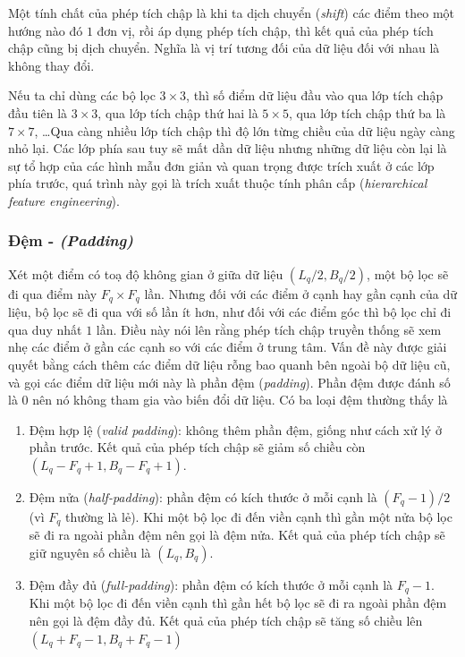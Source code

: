 Một tính chất của phép tích chập là khi ta dịch chuyển (\textit{shift}) các điểm theo một hướng nào đó $1$ đơn vị, rồi áp dụng phép tích chập, thì kết quả của phép tích chập cũng bị dịch chuyển. Nghĩa là vị trí tương đối của dữ liệu đối với nhau là không thay đổi.

Nếu ta chỉ dùng các bộ lọc $3\times 3$, thì số điểm dữ liệu đầu vào qua lớp tích chập đầu tiên là $3\times 3$, qua lớp tích chập thứ hai là $5\times 5$, qua lớp tích chập thứ ba là $7\times 7$, \dots Qua càng nhiều lớp tích chập thì độ lớn từng chiều của dữ liệu ngày càng nhỏ lại. Các lớp phía sau tuy sẽ mất dần dữ liệu nhưng những dữ liệu còn lại là sự tổ hợp của các hình mẫu đơn giản và quan trọng được trích xuất ở các lớp phía trước, quá trình này gọi là trích xuất thuộc tính phân cấp (\textit{hierarchical feature engineering}).

\subsubsection{Đệm - \textit{(Padding)}}
Xét một điểm có toạ độ không gian ở giữa dữ liệu $(L_q/2,B_q/2)$, một bộ lọc sẽ đi qua điểm này $F_q\times F_q$ lần. Nhưng đối với các điểm ở cạnh hay gần cạnh của dữ liệu, bộ lọc sẽ đi qua với số lần ít hơn, như đối với các điểm góc thì bộ lọc chỉ đi qua duy nhất $1$ lần. Điều này nói lên rằng phép tích chập truyền thống sẽ xem nhẹ các điểm ở gần các cạnh so với các điểm ở trung tâm. Vấn đề này được giải quyết bằng cách thêm các điểm dữ liệu rỗng bao quanh bên ngoài bộ dữ liệu cũ, và gọi các điểm dữ liệu mới này là phần đệm (\textit{padding}). Phần đệm được đánh số là $0$ nên nó không tham gia vào biến đổi dữ liệu. Có ba loại đệm thường thấy là
\begin{enumerate}
    \item Đệm hợp lệ (\textit{valid padding}): không thêm phần đệm, giống như cách xử lý ở phần trước. Kết quả của phép tích chập sẽ giảm số chiều còn $(L_q-F_q+1,B_q-F_q+1)$.
    \item Đệm nửa (\textit{half-padding}): phần đệm có kích thước ở mỗi cạnh là $(F_q-1)/2$ (vì $F_q$ thường là lẻ). Khi một bộ lọc đi đến viền cạnh thì gần một nửa bộ lọc sẽ đi ra ngoài phần đệm nên gọi là đệm nửa. Kết quả của phép tích chập sẽ giữ nguyên số chiều là $(L_q,B_q)$.
    \item Đệm đầy đủ (\textit{full-padding}): phần đệm có kích thước ở mỗi cạnh là $F_q-1$. Khi một bộ lọc đi đến viền cạnh thì gần hết bộ lọc sẽ đi ra ngoài phần đệm nên gọi là đệm đầy đủ. Kết quả của phép tích chập sẽ tăng số chiều lên $(L_q+F_q-1,B_q+F_q-1)$
\end{enumerate}


